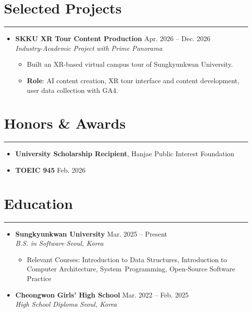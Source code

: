 \documentclass[letterpaper, 10pt]{article}
\begin{document}
\section*{Selected Projects}
\hrule
\vspace{4pt}
\begin{itemize}
\item[]
\textbf{SKKU XR Tour Content Production} \hfill Apr. 2026 -- Dec. 2026 \\
\textit{Industry-Academic Project with Prime Panorama}
\begin{itemize}
\item Built an XR-based virtual campus tour of Sungkyunkwan University.
\item \textbf{Role}: AI content creation, XR tour interface and content development, user data collection with GA4.
\end{itemize}
\end{itemize}
\section*{Honors \& Awards}
\hrule
\vspace{4pt}
\begin{itemize}
\item \textbf{University Scholarship Recipient}, Hanjae Public Interest Foundation
\item \textbf{TOEIC 945} \hfill Feb. 2026
\end{itemize}
\section*{Education}
\hrule
\vspace{4pt}
\begin{itemize}
\item[]
\textbf{Sungkyunkwan University} \hfill Mar. 2025 -- Present \\
\textit{B.S. in Software} \hfill \textit{Seoul, Korea}
\begin{itemize}
\item Relevant Courses: Introduction to Data Structures, Introduction to Computer Architecture, \mbox{System Programming}, Open-Source Software Practice
\end{itemize}
\item[]
\textbf{Cheongwon Girls' High School} \hfill Mar. 2022 -- Feb. 2025 \\
\textit{High School Diploma} \hfill \textit{Seoul, Korea}
\end{itemize}
\end{document}
